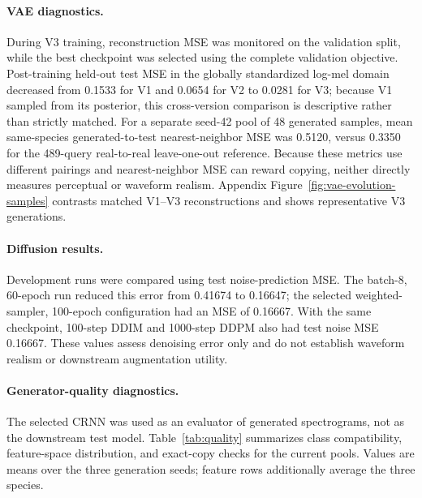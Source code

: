 \documentclass{article}
\begin{document}
\paragraph{VAE diagnostics.}
During V3 training, reconstruction MSE was monitored on the validation split,
while the best checkpoint was selected using the complete validation objective.
Post-training held-out test MSE in the globally standardized log-mel domain
decreased from 0.1533 for V1 and 0.0654 for V2 to 0.0281 for V3; because V1
sampled from its posterior, this cross-version comparison is descriptive rather
than strictly matched. For a separate seed-42 pool of 48 generated samples,
mean same-species generated-to-test nearest-neighbor MSE was 0.5120, versus
0.3350 for the 489-query real-to-real leave-one-out reference. Because these
metrics use different pairings and nearest-neighbor MSE can reward copying,
neither directly measures perceptual or waveform realism. Appendix
Figure~\ref{fig:vae-evolution-samples} contrasts matched V1--V3
reconstructions and shows representative V3 generations.

\paragraph{Diffusion results.}
Development runs were compared using test noise-prediction MSE. The batch-8,
60-epoch run reduced this error from 0.41674 to 0.16647; the selected
weighted-sampler, 100-epoch configuration had an MSE of 0.16667. With the
same checkpoint, 100-step DDIM and 1000-step DDPM also had test noise MSE
0.16667. These values assess denoising error only and do not establish
waveform realism or downstream augmentation utility.

\paragraph{Generator-quality diagnostics.}
The selected CRNN was used as an evaluator of generated spectrograms, not as the
downstream test model. Table~\ref{tab:quality} summarizes class compatibility,
feature-space distribution, and exact-copy checks for the current pools.
Values are means over the three generation seeds; feature rows additionally
average the three species.
\end{document}
